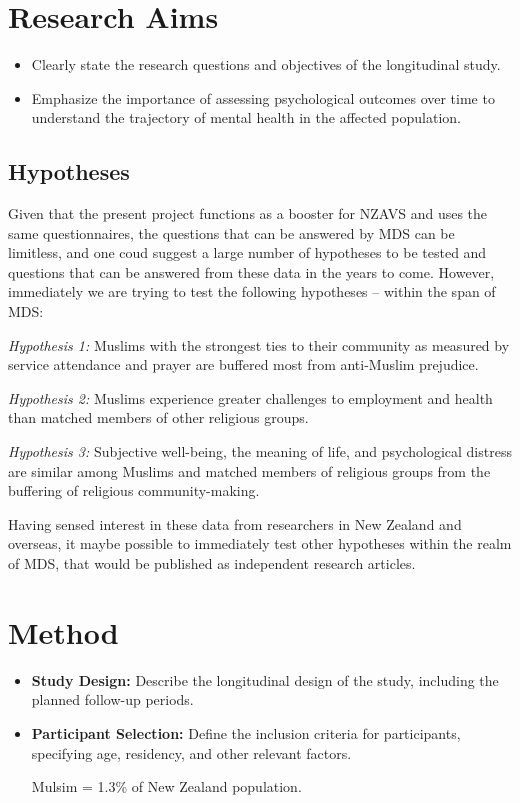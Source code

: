 \documentclass[
  man,
  longtable,
  nolmodern,
  notxfonts,
  notimes,
  colorlinks=true,linkcolor=blue,citecolor=blue,urlcolor=blue]{apa7}
\providecommand{\tightlist}{%
  \setlength{\itemsep}{0pt}\setlength{\parskip}{0pt}}
\begin{document}
\section{Research Aims}\label{research-aims}

\begin{itemize}
\tightlist
\item
  Clearly state the research questions and objectives of the
  longitudinal study.
\item
  Emphasize the importance of assessing psychological outcomes over time
  to understand the trajectory of mental health in the affected
  population.
\end{itemize}

\subsection{Hypotheses}\label{hypotheses}

Given that the present project functions as a booster for NZAVS and uses
the same questionnaires, the questions that can be answered by MDS can
be limitless, and one coud suggest a large number of hypotheses to be
tested and questions that can be answered from these data in the years
to come. However, immediately we are trying to test the following
hypotheses -- within the span of MDS:

\emph{Hypothesis 1:} Muslims with the strongest ties to their community
as measured by service attendance and prayer are buffered most from
anti-Muslim prejudice.

\emph{Hypothesis 2:} Muslims experience greater challenges to employment
and health than matched members of other religious groups.

\emph{Hypothesis 3:} Subjective well-being, the meaning of life, and
psychological distress are similar among Muslims and matched members of
religious groups from the buffering of religious community-making.

Having sensed interest in these data from researchers in New Zealand and
overseas, it maybe possible to immediately test other hypotheses within
the realm of MDS, that would be published as independent research
articles.

\section{Method}\label{method}

\begin{itemize}
\item
  \textbf{Study Design:} Describe the longitudinal design of the study,
  including the planned follow-up periods.
\item
  \textbf{Participant Selection:} Define the inclusion criteria for
  participants, specifying age, residency, and other relevant factors.

  Mulsim = 1.3\% of New Zealand population.
\end{itemize}
\end{document}
